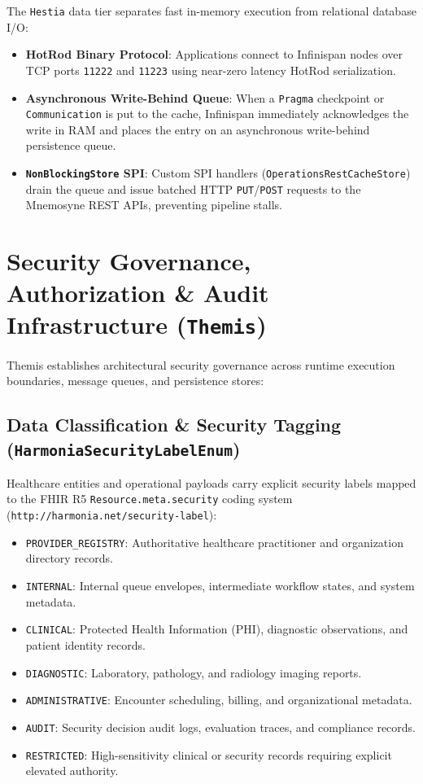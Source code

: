 The \texttt{Hestia} data tier separates fast in-memory execution from relational database I/O:
\begin{itemize}
    \item \textbf{HotRod Binary Protocol}: Applications connect to Infinispan nodes over TCP ports \texttt{11222} and \texttt{11223} using near-zero latency HotRod serialization.
    \item \textbf{Asynchronous Write-Behind Queue}: When a \texttt{Pragma} checkpoint or \texttt{Communication} is put to the cache, Infinispan immediately acknowledges the write in RAM and places the entry on an asynchronous write-behind persistence queue.
    \item \textbf{\texttt{NonBlockingStore} SPI}: Custom SPI handlers (\texttt{OperationsRestCacheStore}) drain the queue and issue batched HTTP \texttt{PUT}/\texttt{POST} requests to the Mnemosyne REST APIs, preventing pipeline stalls.
\end{itemize}

\section{Security Governance, Authorization \& Audit Infrastructure (\texttt{Themis})}
\label{sec:themis_tech_governance}

Themis establishes architectural security governance across runtime execution boundaries, message queues, and persistence stores:

\subsection{Data Classification \& Security Tagging (\texttt{HarmoniaSecurityLabelEnum})}
Healthcare entities and operational payloads carry explicit security labels mapped to the FHIR R5 \texttt{Resource.meta.security} coding system (\texttt{http://harmonia.net/security-label}):
\begin{itemize}
    \item \texttt{PROVIDER\_REGISTRY}: Authoritative healthcare practitioner and organization directory records.
    \item \texttt{INTERNAL}: Internal queue envelopes, intermediate workflow states, and system metadata.
    \item \texttt{CLINICAL}: Protected Health Information (PHI), diagnostic observations, and patient identity records.
    \item \texttt{DIAGNOSTIC}: Laboratory, pathology, and radiology imaging reports.
    \item \texttt{ADMINISTRATIVE}: Encounter scheduling, billing, and organizational metadata.
    \item \texttt{AUDIT}: Security decision audit logs, evaluation traces, and compliance records.
    \item \texttt{RESTRICTED}: High-sensitivity clinical or security records requiring explicit elevated authority.
\end{itemize}

